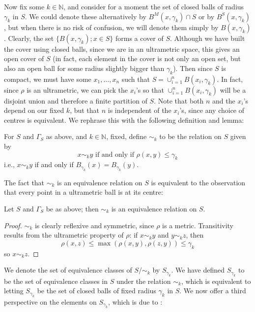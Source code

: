  Now fix some $k \in \mathbb{N}$, and consider for a moment the set of closed balls of radius $\gamma_k$ in $S$. We could denote these alternatively by $B^M(x, \gamma_k) \cap S$ or by  $B^S(x, \gamma_k)$, but when there is no risk of confusion, we will denote them simply by $B(x, \gamma_k)$. Clearly, the set  $\{B(x, \gamma_k); x \in S\}$ forms a cover of $S$. Although we have built the cover using closed balls, since we are in an ultrametric space, this gives an open cover of $S$ (in fact, each element in the cover is not only an open set, but also an open ball for some radius slightly bigger than $\gamma_k$). Then since $S$ is compact, we must have some $x_1,\ldots, x_n$  such that $S= \cup_{i=1}^n B(x_i, \gamma_k)$. In fact,  since $\rho$ is an ultrametric, we can pick the $x_i$'s so that $\cup_{i=1}^n B(x_i, \gamma_k)$ will be a disjoint union and therefore a finite partition of $S$. Note that both $n$ and the $x_i$'s depend on our fixed $k$, but that $n$ is independent of the $x_i$'s, since any choice of centres is equivalent. We rephrase this with the following definition and lemma:\\

\begin{definition}
For $S$ and $\Gamma_S$ as above, and $k \in \mathbb{N}$, fixed,  define $\sim_k$ to  be the relation on $S$ given by \[x \sim_k y\text{ if and only if  }\rho(x,y) \leq \gamma_k\] i.e.,  $x \sim_k y$ if and only if $B_{\gamma_k}(x) = B_{\gamma_k}(y)$.
\end{definition}

The fact that $\sim_k$ is an equivalence relation on $S$ is equivalent to the observation that every point in a ultrametric ball is at its centre:\\

\begin{lemma}
Let  $S$ and $\Gamma_S$ be as above; then $\sim_k$ is an equivalence relation on $S$.
\end{lemma}

\begin{proof}
$\sim_k$ is clearly reflexive and symmetric, since $\rho$ is a metric. Transitivity results from the ultrametric property of $\rho$: if $x \sim_k y$ and $y \sim_k z$, then $$\rho(x, z) \leq \max(\rho(x,y), \rho(z,y)) \leq \gamma_k$$ so $x \sim_k z$. 
\end{proof}

 We denote the set of equivalence classes of $S/\sim_k$ by $S_{\gamma_k}$. We have defined  $S_{\gamma_k}$ to be the set of equivalence classes in $S$ under the relation $\sim_k$, which is equivalent to letting $S_{\gamma_k}$ be the set of closed balls of fixed radius $\gamma_k$ in  $S$. We now offer a third perspective on the elements on $S_{\gamma_k}$, which is due to \cite{na}:\\

